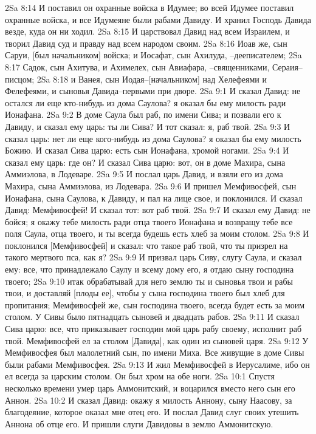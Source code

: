 2Sa 8:14  И поставил он охранные войска в Идумее; во всей Идумее поставил охранные войска, и все Идумеяне были рабами Давиду. И хранил Господь Давида везде, куда он ни ходил.
2Sa 8:15  И царствовал Давид над всем Израилем, и творил Давид суд и правду над всем народом своим.
2Sa 8:16  Иоав же, сын Саруи, [был начальником] войска; и Иосафат, сын Ахилуда, --дееписателем;
2Sa 8:17  Садок, сын Ахитува, и Ахимелех, сын Авиафара, --священниками, Сераия--писцом;
2Sa 8:18  и Ванея, сын Иодая--[начальником] над Хелефеями и Фелефеями, и сыновья Давида--первыми при дворе.
2Sa 9:1  И сказал Давид: не остался ли еще кто-нибудь из дома Саулова? я оказал бы ему милость ради Ионафана.
2Sa 9:2  В доме Саула был раб, по имени Сива; и позвали его к Давиду, и сказал ему царь: ты ли Сива? И тот сказал: я, раб твой.
2Sa 9:3  И сказал царь: нет ли еще кого-нибудь из дома Саулова? я оказал бы ему милость Божию. И сказал Сива царю: есть сын Ионафана, хромой ногами.
2Sa 9:4  И сказал ему царь: где он? И сказал Сива царю: вот, он в доме Махира, сына Аммиэлова, в Лодеваре.
2Sa 9:5  И послал царь Давид, и взяли его из дома Махира, сына Аммиэлова, из Лодевара.
2Sa 9:6  И пришел Мемфивосфей, сын Ионафана, сына Саулова, к Давиду, и пал на лице свое, и поклонился. И сказал Давид: Мемфивосфей! И сказал тот: вот раб твой.
2Sa 9:7  И сказал ему Давид: не бойся; я окажу тебе милость ради отца твоего Ионафана и возвращу тебе все поля Саула, отца твоего, и ты всегда будешь есть хлеб за моим столом.
2Sa 9:8  И поклонился [Мемфивосфей] и сказал: что такое раб твой, что ты призрел на такого мертвого пса, как я?
2Sa 9:9  И призвал царь Сиву, слугу Саула, и сказал ему: все, что принадлежало Саулу и всему дому его, я отдаю сыну господина твоего;
2Sa 9:10  итак обрабатывай для него землю ты и сыновья твои и рабы твои, и доставляй [плоды ее], чтобы у сына господина твоего был хлеб для пропитания; Мемфивосфей же, сын господина твоего, всегда будет есть за моим столом. У Сивы было пятнадцать сыновей и двадцать рабов.
2Sa 9:11  И сказал Сива царю: все, что приказывает господин мой царь рабу своему, исполнит раб твой. Мемфивосфей ел за столом [Давида], как один из сыновей царя.
2Sa 9:12  У Мемфивосфея был малолетний сын, по имени Миха. Все живущие в доме Сивы были рабами Мемфивосфея.
2Sa 9:13  И жил Мемфивосфей в Иерусалиме, ибо он ел всегда за царским столом. Он был хром на обе ноги.
2Sa 10:1  Спустя несколько времени умер царь Аммонитский, и воцарился вместо него сын его Аннон.
2Sa 10:2  И сказал Давид: окажу я милость Аннону, сыну Наасову, за благодеяние, которое оказал мне отец его. И послал Давид слуг своих утешить Аннона об отце его. И пришли слуги Давидовы в землю Аммонитскую.
